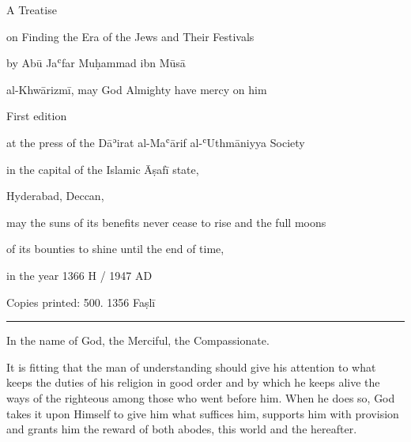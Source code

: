 \documentclass[11pt]{article}
\newcommand{\Pg}[1]{\marginpar{\footnotesize #1}}
\begin{document}
\begin{center}A Treatise\end{center}

\begin{center}on Finding the Era of the Jews and Their Festivals\end{center}

\begin{center}by Abū Jaʿfar Muḥammad ibn Mūsā\end{center}

\begin{center}al-Khwārizmī, may God Almighty have mercy on him\end{center}

\begin{center}First edition\end{center}

\begin{center}at the press of the Dāʾirat al-Maʿārif al-ʿUthmāniyya Society\end{center}

\begin{center}in the capital of the Islamic Āṣafī state,\end{center}

\begin{center}Hyderabad, Deccan,\end{center}

\begin{center}may the suns of its benefits never cease to rise and the full moons\end{center}

\begin{center}of its bounties to shine until the end of time,\end{center}

\begin{center}in the year 1366 H / 1947 AD\end{center}

\begin{center}Copies printed: 500. 1356 Faṣlī\end{center}

\bigskip\noindent\rule{\textwidth}{0.4pt}\bigskip

\begin{center}\Pg{p. 2}In the name of God, the Merciful, the Compassionate.\end{center}

It is fitting that the man of understanding should give his attention to what keeps the duties of his religion in good order and by which he keeps alive the ways of the righteous among those who went before him. When he does so, God takes it upon Himself to give him what suffices him, supports him with provision and grants him the reward of both abodes, this world and the hereafter.
\end{document}
